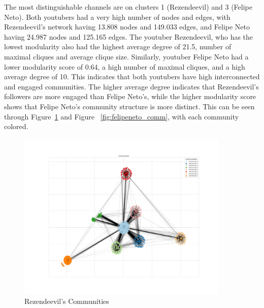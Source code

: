 \documentclass[12pt]{article}
\begin{document}
The most distinguishable channels are on clusters 1 (Rezendeevil) and 3 (Felipe Neto). 
Both youtubers had a very high number of nodes and edges, with Rezendeevil's network having 13.808 
nodes and 149.033 edges, and Felipe Neto having 24.987 nodes and 125.165 edges.
The youtuber Rezendeevil, who has the lowest modularity also had the highest 
average degree of 21.5, number of maximal cliques and average clique size.
Similarly, youtuber Felipe Neto had a lower modularity score of 0.64, a high number of maximal cliques,
and a high average degree of 10.
This indicates that both youtubers have high interconnected and engaged communities. The higher average
degree indicates that Rezendeevil's followers are more engaged than Felipe Neto's, while the higher
modularity score shows that Felipe Neto's community structure is more distinct.
This can be seen through Figure~\ref{fig:rezendeevil_comm} and Figure ~\ref{fig:felipeneto_comm}, 
with each community colored. 


\begin{figure}[t!]
    \centering
    \includegraphics[keepaspectratio,width=0.9\textwidth]{./imgs/rezendeevil/communities.png}
    \caption[width=\textwidth]{Rezendeevil's Communities}
    \label{fig:rezendeevil_comm}
\end{figure}
\end{document}
